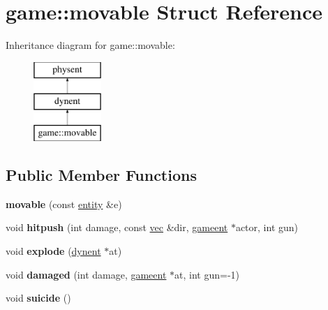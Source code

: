 \hypertarget{structgame_1_1movable}{}\section{game\+:\+:movable Struct Reference}
\label{structgame_1_1movable}
Inheritance diagram for game\+:\+:movable\+:\begin{figure}[H]
\begin{center}
\leavevmode
\includegraphics[height=3.000000cm]{structgame_1_1movable}
\end{center}
\end{figure}
\subsection*{Public Member Functions}
\begin{DoxyCompactItemize}
\item 
\mbox{\label{structgame_1_1movable_aedd21a2cb0498836cd5116de684b4f9e}} 
{\bfseries movable} (const \hyperlink{structentity}{entity} \&e)
\item 
\mbox{\label{structgame_1_1movable_a6a033a5bcdba8e1c1b259520fc5c3d23}} 
void {\bfseries hitpush} (int damage, const \hyperlink{structvec}{vec} \&dir, \hyperlink{structgameent}{gameent} $\ast$actor, int gun)
\item 
\mbox{\label{structgame_1_1movable_af22e51fc6cc47be20dadc00eeed9d5ff}} 
void {\bfseries explode} (\hyperlink{structdynent}{dynent} $\ast$at)
\item 
\mbox{\label{structgame_1_1movable_aef0170a038b39f2d919d46779679ab6d}} 
void {\bfseries damaged} (int damage, \hyperlink{structgameent}{gameent} $\ast$at, int gun=-\/1)
\item 
\mbox{\label{structgame_1_1movable_ac6ac41d298b5fc3ea91c2d29a132c9f0}} 
void {\bfseries suicide} ()
\end{DoxyCompactItemize}
